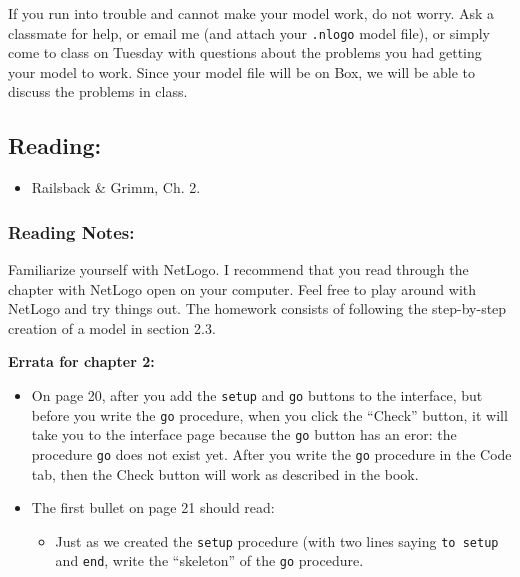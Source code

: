 \documentclass[]{article}
\providecommand{\tightlist}{%
  \setlength{\itemsep}{0pt}\setlength{\parskip}{0pt}}
\begin{document}
If you run into trouble and cannot make your model work, do not worry.
Ask a classmate for help, or email me (and attach your \texttt{.nlogo}
model file), or simply come to class on Tuesday with questions about the
problems you had getting your model to work. Since your model file will
be on Box, we will be able to discuss the problems in class.

\hypertarget{reading-2}{%
\subsection{Reading:}\label{reading-2}}

\begin{itemize}
\tightlist
\item
  Railsback \& Grimm, Ch. 2.
\end{itemize}

\hypertarget{reading-notes-1}{%
\subsubsection{Reading Notes:}\label{reading-notes-1}}

Familiarize yourself with NetLogo. I recommend that you read through the
chapter with NetLogo open on your computer. Feel free to play around
with NetLogo and try things out. The homework consists of following the
step-by-step creation of a model in section 2.3.

\textbf{Errata for chapter 2:}

\begin{itemize}
\tightlist
\item
  On page 20, after you add the \texttt{setup} and \texttt{go} buttons
  to the interface, but before you write the \texttt{go} procedure, when
  you click the ``Check'' button, it will take you to the interface page
  because the \texttt{go} button has an eror: the procedure \texttt{go}
  does not exist yet. After you write the \texttt{go} procedure in the
  Code tab, then the Check button will work as described in the book.
\item
  The first bullet on page 21 should read:

  \begin{itemize}
  \tightlist
  \item
    Just as we created the \texttt{setup} procedure (with two lines
    saying \texttt{to\ setup} and \texttt{end}, write the ``skeleton''
    of the \texttt{go} procedure.
  \end{itemize}
\end{itemize}
\end{document}
